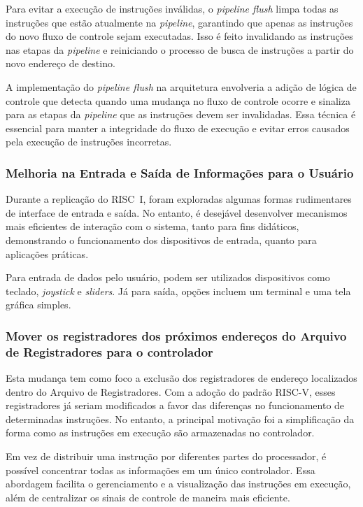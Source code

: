 \documentclass[
	12pt,				%
	openright,			%
	oneside,			%
	a4paper,			%
	english,			%
	french,				%
	spanish,			%
	brazil,				%
	]{abntex2}
\begin{document}
Para evitar a execução de instruções inválidas, o \textit{pipeline flush} limpa todas as instruções que estão atualmente na \textit{pipeline}, garantindo que apenas as instruções do novo fluxo de controle sejam executadas. Isso é feito invalidando as instruções nas etapas da \textit{pipeline} e reiniciando o processo de busca de instruções a partir do novo endereço de destino.

A implementação do \textit{pipeline flush} na arquitetura envolveria a adição de lógica de controle que detecta quando uma mudança no fluxo de controle ocorre e sinaliza para as etapas da \textit{pipeline} que as instruções devem ser invalidadas. Essa técnica é essencial para manter a integridade do fluxo de execução e evitar erros causados pela execução de instruções incorretas.

\subsubsection{Melhoria na Entrada e Saída de Informações para o Usuário}\label{recursos_melhoria_IO}%

Durante a replicação do RISC~I, foram exploradas algumas formas rudimentares de interface de entrada e saída. No entanto, é desejável desenvolver mecanismos mais eficientes de interação com o sistema, tanto para fins didáticos, demonstrando o funcionamento dos dispositivos de entrada, quanto para aplicações práticas.

Para entrada de dados pelo usuário, podem ser utilizados dispositivos como teclado, \textit{joystick} e \textit{sliders}. Já para saída, opções incluem um terminal e uma tela gráfica simples.

\subsubsection{Mover os registradores dos próximos endereços do Arquivo de Registradores para o controlador}\label{recursos_mover_reg_regfile}%

Esta mudança tem como foco a exclusão dos registradores de endereço localizados dentro do Arquivo de Registradores. Com a adoção do padrão RISC-V, esses registradores já seriam modificados a favor das diferenças no funcionamento de determinadas instruções. No entanto, a principal motivação foi a simplificação da forma como as instruções em execução são armazenadas no controlador.

Em vez de distribuir uma instrução por diferentes partes do processador, é possível concentrar todas as informações em um único controlador. Essa abordagem facilita o gerenciamento e a visualização das instruções em execução, além de centralizar os sinais de controle de maneira mais eficiente.
\end{document}

